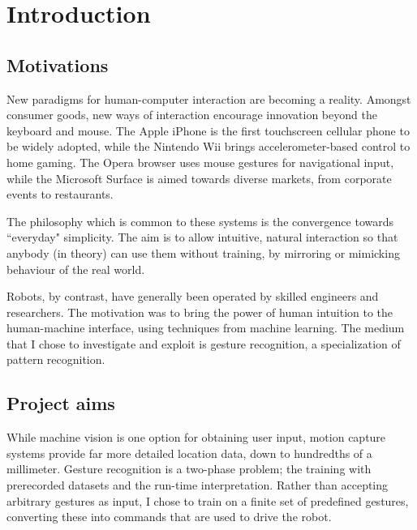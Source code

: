 \documentclass[12pt,a4,notitlepage]{report}
\renewcommand{\_}{\texttt{\symbol{95}}}
\newcommand{\<}{\texttt{\symbol{60}}}
\renewcommand{\>}{\texttt{\symbol{62}}}
\begin{document}
\cleardoublepage

\tableofcontents

\listoffigures


\cleardoublepage        %

\setcounter{page}{1}
\pagestyle{headings}

\chapter{Introduction}

\section{Motivations}
New paradigms for human-computer interaction are becoming a reality. Amongst consumer goods, new ways of interaction encourage innovation beyond the keyboard and mouse. The Apple iPhone is the first touchscreen cellular phone to be widely adopted, while the Nintendo Wii brings accelerometer-based control to home gaming. The Opera browser uses mouse gestures for navigational input, while the Microsoft Surface is aimed towards diverse markets, from corporate events to restaurants.

The philosophy which is common to these systems is the convergence towards ``everyday" simplicity. The aim is to allow intuitive, natural interaction so that anybody (in theory) can use them without training, by mirroring or mimicking behaviour of the real world.

Robots, by contrast, have generally been operated by skilled engineers and researchers. The motivation was to bring the power of human intuition to the human-machine interface, using techniques from machine learning. The medium that I chose to investigate and exploit is gesture recognition, a specialization of pattern recognition.

\section{Project aims}

While machine vision is one option for obtaining user input, motion capture systems provide far more detailed location data, down to hundredths of a millimeter. Gesture recognition is a two-phase problem; the training with prerecorded datasets and the run-time interpretation. Rather than accepting arbitrary gestures as input, I chose to train on a finite set of predefined gestures, converting these into commands that are used to drive the robot. 
\end{document}
